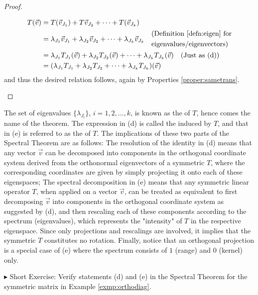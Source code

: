 \begin{proof}
\begin{enumerate}[label=(\alph*)]
\begin{align*}
T(\vec{v}) &= T(\vec{v}_{J_1}) + T\vec{v}_{J_2} + \cdots + T(\vec{v}_{J_k}) \\
&= \lambda_{J_1}\vec{v}_{J_1} + \lambda_{J_2}\vec{v}_{J_2} + \cdots + \lambda_{J_k}\vec{v}_{J_k} \quad \begin{aligned}
&\text{(Definition \ref{defn:eigen} for} \\
&\text{eigenvalues/eigenvectors)}
\end{aligned} \\
&= \lambda_{J_1}T_{J_1}(\vec{v}) + \lambda_{J_2}T_{J_2}(\vec{v}) + \cdots + \lambda_{J_k}T_{J_k}(\vec{v}) \text{\quad (Just as (d))} \\
&= (\lambda_{J_1}T_{J_1} + \lambda_{J_2}T_{J_2} + \cdots + \lambda_{J_k}T_{J_k})(\vec{v})
\end{align*}
and thus the desired relation follows, again by Properties \ref{proper:sametrans}.
\end{enumerate}
\end{proof}
The set of eigenvalues $\{\lambda_{J_i}\}$, $i = 1,2,\ldots,k$, is known as the  of $T$, hence comes the name of the theorem. The expression in (d) is called the  induced by $T$, and that in (e) is referred to as the  of $T$. The implications of these two parts of the Spectral Theorem are as follows: The resolution of the identity in (d) means that any vector $\vec{v}$ can be decomposed into components in the orthogonal coordinate system derived from the orthonormal eigenvectors of a symmetric $T$, where the corresponding coordinates are given by simply projecting it onto each of these eigenspaces; The spectral decomposition in (e) means that any symmetric linear operator $T$, when applied on a vector $\vec{v}$, can be treated as equivalent to first decomposing $\vec{v}$ into components in the orthogonal coordinate system as suggested by (d), and then rescaling each of these components according to the spectrum (eigenvalues), which represents the "intensity" of $T$ in the respective eigenspace. Since only projections and rescalings are involved, it implies that the symmetric $T$ constitutes no rotation. Finally, notice that an orthogonal projection is a special case of (e) where the spectrum consists of $1$ (range) and $0$ (kernel) only.\par
$\blacktriangleright$ Short Exercise: Verify statements (d) and (e) in the Spectral Theorem for the symmetric matrix in Example \ref{exmp:orthodiag}.\footnotemark

